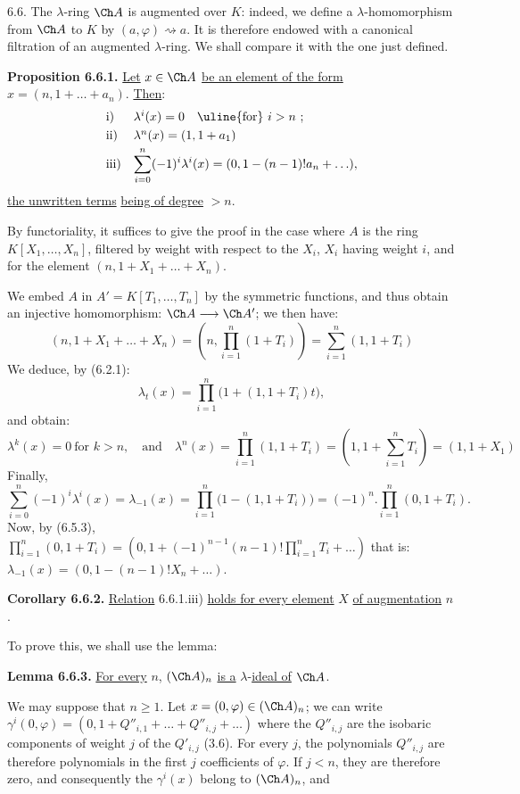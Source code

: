 6.6. The \(\lambda\)-ring \(\Ch A\) is augmented over \(K\): indeed, we define a \(\lambda\)-homomorphism from \(\Ch A\) to \(K\) by \((a,\varphi)\rightsquigarrow a\). It is therefore endowed with a canonical filtration of an augmented \(\lambda\)-ring. We shall compare it with the one just defined.

\textbf{Proposition 6.6.1.} \uline{Let} \(x\in\Ch A\) \uline{be an element of the form} \(x=(n,1+\ldots+a_n)\). \uline{Then}:
\[
\begin{array}{ll}
\text{i)}& \lambda^i(x)=0\quad\text{\uline{for} }i>n~;\\[0.3em]
\text{ii)}& \lambda^n(x)=(1,1+a_1)\\[0.3em]
\text{iii)}& \displaystyle\sum_{i=0}^n(-1)^i\lambda^i(x)
       =(0,1-(n-1)!a_n+\ldots),
\end{array}
\]
\uline{the unwritten terms} \uline{being of degree} \(>n\).

By functoriality, it suffices to give the proof in the case
%
where \(A\) is the ring \(K[X_1,\ldots,X_n]\), filtered by weight with respect to the \(X_i\), \(X_i\) having weight \(i\), and for the element \((n,1+X_1+\ldots+X_n)\).

We embed \(A\) in \(A'=K[T_1,\ldots,T_n]\) by the symmetric functions, and thus obtain an injective homomorphism: \(\Ch A\longrightarrow\Ch A'\); we then have:
\[
 (n,1+X_1+\ldots+X_n)
 =
 \left(n,\prod_{i=1}^n(1+T_i)\right)
 =
 \sum_{i=1}^n(1,1+T_i)
\]
We deduce, by (6.2.1):
\[
  \lambda_t(x)=\prod_{i=1}^n\bigl(1+(1,1+T_i)t\bigr),
\]
and obtain:
\[
  \lambda^k(x)=0\ \text{for }k>n,\quad\text{and}\quad
  \lambda^n(x)=\prod_{i=1}^n(1,1+T_i)
   =\left(1,1+\sum_{i=1}^nT_i\right)=(1,1+X_1)
\]
Finally,
\[
  \sum_{i=0}^n(-1)^i\lambda^i(x)=\lambda_{-1}(x)
  =
  \prod_{i=1}^n\bigl(1-(1,1+T_i)\bigr)
  =
  (-1)^n.\prod_{i=1}^n(0,1+T_i).
\]
Now, by (6.5.3), \(\prod_{i=1}^n(0,1+T_i)=\left(0,1+(-1)^{n-1}(n-1)!\prod_{i=1}^nT_i+\ldots\right)\)
that is: \(\lambda_{-1}(x)=(0,1-(n-1)!X_n+\ldots)\).

\textbf{Corollary 6.6.2.} \uline{Relation} 6.6.1.iii) \uline{holds for every element} \(X\) \uline{of augmentation} \(n\).

To prove this, we shall use the lemma:

\textbf{Lemma 6.6.3.} \uline{For every} \(n\), \((\Ch A)_n\) \uline{is a} \(\lambda\)-\uline{ideal of} \(\Ch A\).

We may suppose that \(n\ge1\). Let \(x=(0,\varphi)\in(\Ch A)_n\); we can write \(\gamma^i(0,\varphi)=(0,1+Q''_{i,1}+\ldots+Q''_{i,j}+\ldots)\) where the \(Q''_{i,j}\) are the isobaric components of weight \(j\) of the \(Q'_{i,j}\) (3.6). For every \(j\), the polynomials \(Q''_{i,j}\) are therefore polynomials in the first \(j\) coefficients of \(\varphi\). If \(j<n\), they are therefore zero, and consequently the \(\gamma^i(x)\) belong to \((\Ch A)_n\), and
